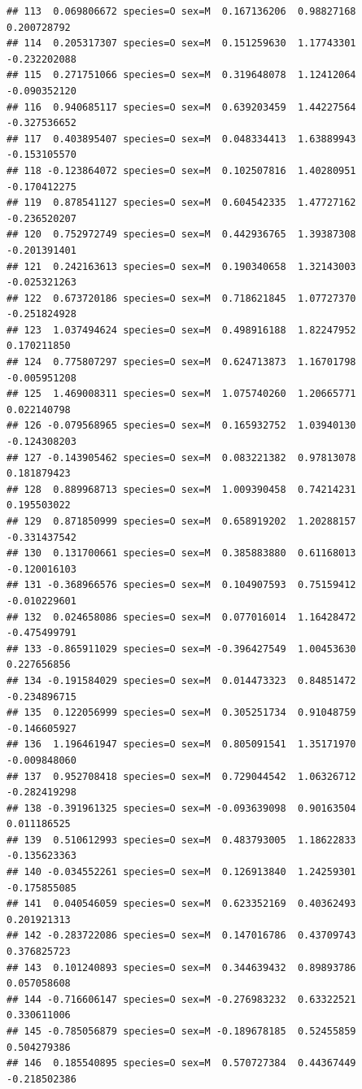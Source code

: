 \documentclass{beamer}\usepackage[]{graphicx}\usepackage[]{color}
\makeatletter
\newenvironment{kframe}{%
 \def\at@end@of@kframe{}%
 \ifinner\ifhmode%
  \def\at@end@of@kframe{\end{minipage}}%
  \begin{minipage}{\columnwidth}%
 \fi\fi%
 \def\FrameCommand##1{\hskip\@totalleftmargin \hskip-\fboxsep
 \colorbox{shadecolor}{##1}\hskip-\fboxsep
     \hskip-\linewidth \hskip-\@totalleftmargin \hskip\columnwidth}%
 \MakeFramed {\advance\hsize-\width
   \@totalleftmargin\z@ \linewidth\hsize
   \@setminipage}}%
 {\par\unskip\endMakeFramed%
 \at@end@of@kframe}
\newenvironment{knitrout}{}{} %
\makeatother
\begin{document}
\begin{frame}[fragile]
\begin{knitrout}
\begin{kframe}
\begin{verbatim}
## 113  0.069806672 species=O sex=M  0.167136206  0.98827168     0.200728792
## 114  0.205317307 species=O sex=M  0.151259630  1.17743301    -0.232202088
## 115  0.271751066 species=O sex=M  0.319648078  1.12412064    -0.090352120
## 116  0.940685117 species=O sex=M  0.639203459  1.44227564    -0.327536652
## 117  0.403895407 species=O sex=M  0.048334413  1.63889943    -0.153105570
## 118 -0.123864072 species=O sex=M  0.102507816  1.40280951    -0.170412275
## 119  0.878541127 species=O sex=M  0.604542335  1.47727162    -0.236520207
## 120  0.752972749 species=O sex=M  0.442936765  1.39387308    -0.201391401
## 121  0.242163613 species=O sex=M  0.190340658  1.32143003    -0.025321263
## 122  0.673720186 species=O sex=M  0.718621845  1.07727370    -0.251824928
## 123  1.037494624 species=O sex=M  0.498916188  1.82247952     0.170211850
## 124  0.775807297 species=O sex=M  0.624713873  1.16701798    -0.005951208
## 125  1.469008311 species=O sex=M  1.075740260  1.20665771     0.022140798
## 126 -0.079568965 species=O sex=M  0.165932752  1.03940130    -0.124308203
## 127 -0.143905462 species=O sex=M  0.083221382  0.97813078     0.181879423
## 128  0.889968713 species=O sex=M  1.009390458  0.74214231     0.195503022
## 129  0.871850999 species=O sex=M  0.658919202  1.20288157    -0.331437542
## 130  0.131700661 species=O sex=M  0.385883880  0.61168013    -0.120016103
## 131 -0.368966576 species=O sex=M  0.104907593  0.75159412    -0.010229601
## 132  0.024658086 species=O sex=M  0.077016014  1.16428472    -0.475499791
## 133 -0.865911029 species=O sex=M -0.396427549  1.00453630     0.227656856
## 134 -0.191584029 species=O sex=M  0.014473323  0.84851472    -0.234896715
## 135  0.122056999 species=O sex=M  0.305251734  0.91048759    -0.146605927
## 136  1.196461947 species=O sex=M  0.805091541  1.35171970    -0.009848060
## 137  0.952708418 species=O sex=M  0.729044542  1.06326712    -0.282419298
## 138 -0.391961325 species=O sex=M -0.093639098  0.90163504     0.011186525
## 139  0.510612993 species=O sex=M  0.483793005  1.18622833    -0.135623363
## 140 -0.034552261 species=O sex=M  0.126913840  1.24259301    -0.175855085
## 141  0.040546059 species=O sex=M  0.623352169  0.40362493     0.201921313
## 142 -0.283722086 species=O sex=M  0.147016786  0.43709743     0.376825723
## 143  0.101240893 species=O sex=M  0.344639432  0.89893786     0.057058608
## 144 -0.716606147 species=O sex=M -0.276983232  0.63322521     0.330611006
## 145 -0.785056879 species=O sex=M -0.189678185  0.52455859     0.504279386
## 146  0.185540895 species=O sex=M  0.570727384  0.44367449    -0.218502386

\end{verbatim}
\end{kframe}
\end{knitrout}
\end{frame}
\end{document}
